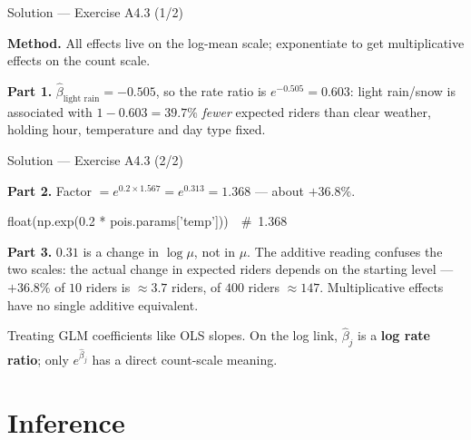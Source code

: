 \documentclass[aspectratio=169,11pt]{beamer}
\begin{document}
\begin{frame}{Solution --- Exercise A4.3 (1/2)}
\begin{solutionbox}
  \textbf{Method.} All effects live on the log-mean scale; exponentiate to get
  multiplicative effects on the count scale.

  \textbf{Part 1.} $\hat\beta_{\text{light rain}} = -0.505$, so the rate ratio is
  $e^{-0.505} = 0.603$: light rain/snow is associated with
  $1-0.603 = \mathbf{39.7\%}$ \emph{fewer} expected riders than clear weather, holding
  hour, temperature and day type fixed.
\end{solutionbox}
\end{frame}

\begin{frame}{Solution --- Exercise A4.3 (2/2)}
\begin{solutionbox}
  \textbf{Part 2.} Factor $= e^{0.2\times 1.567} = e^{0.313} = \mathbf{1.368}$ ---
  about $+36.8\%$.
  \begin{center}\ttfamily float(np.exp(0.2 * pois.params['temp']))\ \ \#\ 1.368\end{center}

  \textbf{Part 3.} $0.31$ is a change in $\log\mu$, not in $\mu$. The additive reading
  confuses the two scales: the actual change in expected riders depends on the starting
  level --- $+36.8\%$ of $10$ riders is $\approx 3.7$ riders, of $400$ riders
  $\approx 147$. Multiplicative effects have no single additive equivalent.
\end{solutionbox}
\begin{mistake}
  Treating GLM coefficients like OLS slopes. On the log link, $\hat\beta_j$ is a
  \textbf{log rate ratio}; only $e^{\hat\beta_j}$ has a direct count-scale meaning.
\end{mistake}
\end{frame}

\section{Inference}
\end{document}
